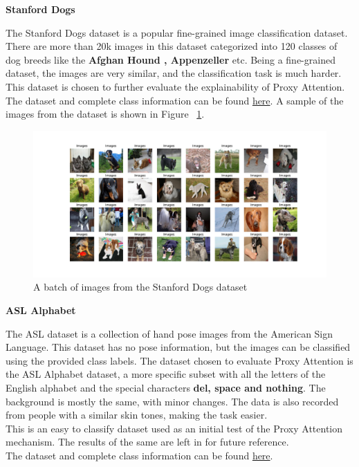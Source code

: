 \documentclass[a4paper,11pt,openright]{book}
\begin{document}
\textbf{Stanford Dogs}

The Stanford Dogs dataset \cite{khoslaNovelDatasetFineGrained} is a popular fine-grained image classification dataset. There are more than 20k images in this dataset categorized into  120 classes of dog breeds like the \textbf{Afghan Hound , Appenzeller} etc. Being a fine-grained dataset, the images are very similar, and the classification task is much harder.\\
This dataset is chosen to further evaluate the explainability of Proxy Attention.\\
The dataset and complete class information can be found \href{http://vision.stanford.edu/aditya86/ImageNetDogs/}{here}.
A sample of the images from the dataset is shown in Figure ~\ref{fig:dogs}.
\begin{figure}[!htb]
    \centering
    \includegraphics[width=1\textwidth]{images/dogs.pdf}
    \caption{A batch of images from the Stanford Dogs dataset}
    \label{fig:dogs}
\end{figure}

\textbf{ASL Alphabet}

The ASL dataset is a collection of hand pose images from the American Sign Language. This dataset has no pose information, but the images can be classified using the provided class labels.
The dataset chosen to evaluate Proxy Attention is the ASL Alphabet dataset, a more specific subset with all the letters of the English alphabet and the special characters \textbf{del, space and nothing}. The background is mostly the same, with minor changes. The data is also recorded from people with a similar skin tones, making the task easier.\\
This is an easy to classify dataset used as an initial test of the Proxy Attention mechanism. The results of the same are left in for future reference. \\
The dataset and complete class information can be found \href{https://www.kaggle.com/datasets/grassknoted/asl-alphabet}{here}.
\end{document}
